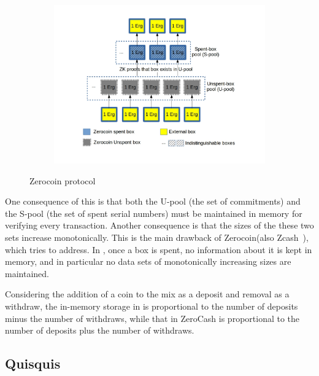 \documentclass[runningheads]{llncs}
\newcommand{\zerocoin}{Zerocoin\xspace}
\begin{document}
\begin{figure}[h]
	\centering
	\begin{subfigure}{.7\textwidth}
		\centering
		\includegraphics[width=\linewidth]{Zerocoin.jpg}
	\end{subfigure}
	\caption{\zerocoin protocol}
	\label{fig:zerocoin}
\end{figure}

One consequence of this is that both the U-pool (the set of commitments) and the S-pool (the set of spent serial numbers) must be maintained in memory for verifying every transaction. 
Another consequence is that the sizes of the these two sets increase monotonically. 
This is the main drawback of \zerocoin (also Zcash~\cite{zcash}), which \algname tries to address. 
In \algname, once a box is spent, no information about it is kept in memory, and in particular no data sets of monotonically increasing sizes are maintained. 

Considering the addition of a coin to the mix as a deposit and removal as a withdraw, the in-memory storage in \algname is proportional to the number of deposits minus the number of withdraws, while that in ZeroCash is proportional to the number of deposits plus the number of withdraws.  

\subsection{Quisquis}
\end{document}
